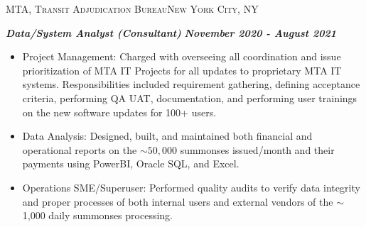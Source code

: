 \documentclass[a4paper]{article}
\newcommand{\jobtitle} [1] {
    {\hspace*{-18pt} \textsc{#1}}
    
}
\begin{document}
\jobtitle{MTA, Transit Adjudication Bureau\hfill New York City, NY}
\hspace*{-16pt}\textit{\textbf{Data/System Analyst (Consultant)}} \hfill \textit{\textbf{November 2020 - August 2021}}\\
\vspace{-1mm}
\begin{itemize}[leftmargin=10pt,align=left] \itemsep 1pt
    \item Project Management: Charged with overseeing all coordination and issue prioritization of MTA IT Projects for all updates to proprietary MTA IT systems.
            Responsibilities included requirement gathering, defining acceptance criteria, performing QA UAT, documentation, and performing user trainings on the new software updates for 100+ users.
	\item Data Analysis: Designed, built, and maintained both financial and operational reports on the $\sim 50,000$ summonses issued/month and their payments using PowerBI, Oracle SQL, and Excel.
    \item Operations SME/Superuser: Performed quality audits to verify data integrity and proper processes of both internal users and external vendors of the $\sim$ 1,000 daily summonses processing.
\end{itemize}
\end{document}

